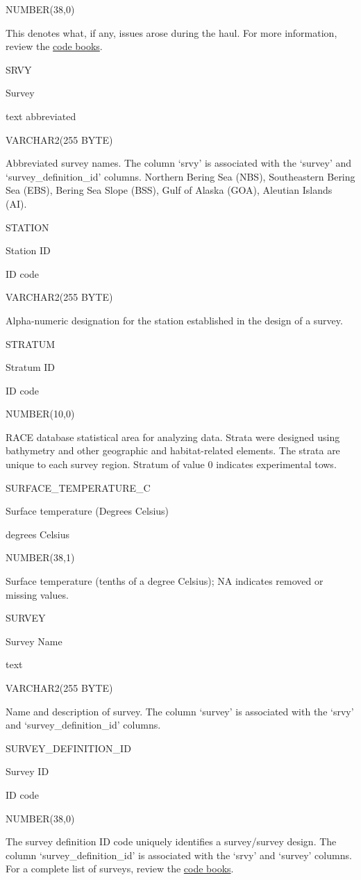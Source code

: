 \documentclass[
  letterpaper,
  oneside,
  open=any]{scrbook}
\begin{document}
NUMBER(38,0)

This denotes what, if any, issues arose during the haul. For more
information, review the
\href{https://www.fisheries.noaa.gov/resource/document/groundfish-survey-species-code-manual-and-data-codes-manual}{code
books}.

SRVY

Survey

text abbreviated

VARCHAR2(255 BYTE)

Abbreviated survey names. The column `srvy' is associated with the
`survey' and `survey\_definition\_id' columns. Northern Bering Sea
(NBS), Southeastern Bering Sea (EBS), Bering Sea Slope (BSS), Gulf of
Alaska (GOA), Aleutian Islands (AI).

STATION

Station ID

ID code

VARCHAR2(255 BYTE)

Alpha-numeric designation for the station established in the design of a
survey.

STRATUM

Stratum ID

ID code

NUMBER(10,0)

RACE database statistical area for analyzing data. Strata were designed
using bathymetry and other geographic and habitat-related elements. The
strata are unique to each survey region. Stratum of value 0 indicates
experimental tows.

SURFACE\_TEMPERATURE\_C

Surface temperature (Degrees Celsius)

degrees Celsius

NUMBER(38,1)

Surface temperature (tenths of a degree Celsius); NA indicates removed
or missing values.

SURVEY

Survey Name

text

VARCHAR2(255 BYTE)

Name and description of survey. The column `survey' is associated with
the `srvy' and `survey\_definition\_id' columns.

SURVEY\_DEFINITION\_ID

Survey ID

ID code

NUMBER(38,0)

The survey definition ID code uniquely identifies a survey/survey
design. The column `survey\_definition\_id' is associated with the
`srvy' and `survey' columns. For a complete list of surveys, review the
\href{https://www.fisheries.noaa.gov/resource/document/groundfish-survey-species-code-manual-and-data-codes-manual}{code
books}.
\end{document}
